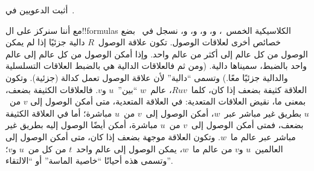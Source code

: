 \documentclass[../../../include/open-logic-section]{subfiles}
\begin{document}
\begin{prob}
  أثبت الدعويين في~.
\end{prob}

مع أننا سنركز على ال!!{formula}s الكلاسيكية الخمس~، و،
و، و، و، نسجل في~ بضع خصائص
أخرى لعلاقات الوصول. تكون علاقة الوصول~$R$ دالية جزئيًا إذا لم يمكن
الوصول من كل عالم إلى أكثر من عالم واحد. وإذا أمكن الوصول من كل عالم
إلى عالم واحد بالضبط، سميناها دالية. (ومن ثم فالعلاقات الدالية هي
بالضبط العلاقات التسلسلية والدالية جزئيًا معًا.) وتسمى ``دالية'' لأن
علاقة الوصول تعمل كدالة (جزئية). وتكون العلاقة كثيفة بضعف إذا كان،
كلما~$Ruv$، عالم~$w$ ``بين''~$u$ و$v$. فالعلاقات الكثيفة بضعف، بمعنى
ما، نقيض العلاقات المتعدية: في العلاقة المتعدية، متى أمكن الوصول إلى
$v$ من~$u$ بطريق غير مباشر عبر~$w$، أمكن الوصول إلى~$v$ من~$u$
مباشرة؛ أما في العلاقة الكثيفة بضعف، فمتى أمكن الوصول إلى~$v$ من~$u$
مباشرة، أمكن أيضًا الوصول إليه بطريق غير مباشر عبر عالم ما~$w$.
وتكون العلاقة موجهة بضعف إذا كان، متى أمكن الوصول إلى العالمين~$u$
و$v$ من عالم ما~$w$، يمكن الوصول إلى عالم واحد~$t$ من كل من~$u$
و$v$؛ وتسمى هذه أحيانًا ``خاصية الماسة'' أو ``الالتقاء''.
\end{document}
